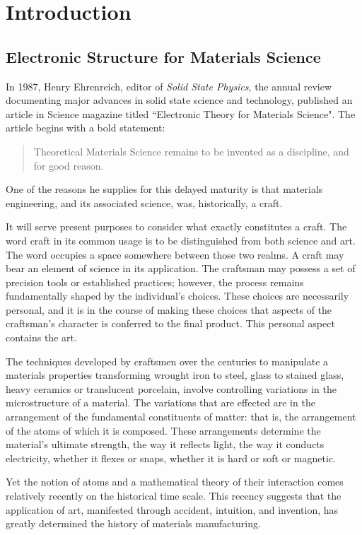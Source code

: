 \chapter{Introduction}
\section{Electronic Structure for Materials Science}
In 1987, Henry Ehrenreich, 
editor of \textit{Solid State Physics}, the annual review documenting major advances in
solid state science and technology, published an article in Science magazine titled 
``Electronic Theory for Materials Science"\cite{ehrenreich87}. The article begins
with a bold statement:
%
\begin{quote}
Theoretical Materials Science remains to be invented as a discipline, and for good reason.
\end{quote}
%
One of the reasons he supplies for this delayed maturity is that materials engineering, 
and its associated science, was, historically, a craft.

It will serve present purposes to consider what exactly constitutes a craft. 
The word craft in its common usage is to be distinguished from both science and art.
The word occupies a space somewhere between those two realms. 
A craft may bear an element of science in its application. 
The craftsman may possess a set of precision tools or 
established practices; however, the process remains fundamentally shaped by 
the individual's choices. These choices are necessarily personal,
and it is in the course of making these choices that aspects 
of the craftsman's character is conferred to the final product. This
personal aspect contains the art.

The techniques developed by craftsmen over the centuries to manipulate a
materials properties transforming wrought iron to steel, glass to stained glass, 
heavy ceramics or translucent porcelain, involve controlling variations in the microstructure of a material. 
The variations that are effected are in the arrangement of the fundamental constituents of matter:
that is, the arrangement of the atoms of which it is composed. These 
arrangements determine the material's ultimate 
strength, the way it reflects light, the way it conducts electricity, 
whether it flexes or snaps, whether it is hard or soft or magnetic.

Yet the notion of atoms and a mathematical theory of their interaction comes relatively
recently on the historical time scale. This recency suggests that the application of 
art, manifested through accident, intuition, and invention, has greatly determined the history
of materials manufacturing.

